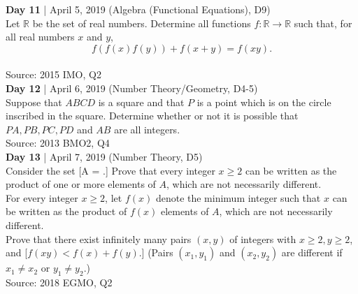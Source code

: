 \documentclass{article}
\newcommand{\problem}[6]{
\textbf{Day #1} | #2 (#5, D#6)\\
#4 \\
Source: #3\\
}
\begin{document}
\problem{11}{April 5, 2019}{2015 IMO, Q2}{Let $\mathbb{R}$ be the set of real numbers. Determine all functions $f : \mathbb{R} \to \mathbb{R}$ such that, for all real numbers $x$ and $y$, \[f(f(x)f(y)) + f(x + y) = f(xy).\]}{Algebra (Functional Equations)}{9}

\problem{12}{April 6, 2019}{2013 BMO2, Q4}{Suppose that $ABCD$ is a square and that $P$ is a point which is on the circle inscribed in the square. Determine whether or not it is possible that $PA, PB, PC, PD$ and $AB$ are all integers.}{Number Theory/Geometry}{4-5}

\problem{13}{April 7, 2019}{2018 EGMO, Q2}{Consider the set [A = \left{1 + \frac 1k : k = 1, 2, 3, \dots \right}.]
Prove that every integer $x \geq 2$ can be written as the product of one or more elements of $A$, which are not necessarily different. \\
For every integer $x \geq 2$, let $f(x)$ denote the minimum integer such that $x$ can be written as the product of $f(x)$ elements of $A$, which are not necessarily different. \\
Prove that there exist infinitely many pairs $(x, y)$ of integers with $x \geq 2, y \geq 2$, and [$f(xy) < f(x) + f(y)$.] (Pairs $(x_1, y_1)$ and $(x_2, y_2)$ are different if $x_1 \neq x_2$ or $y_1 \neq y_2$.)}{Number Theory}{5}
\end{document}
